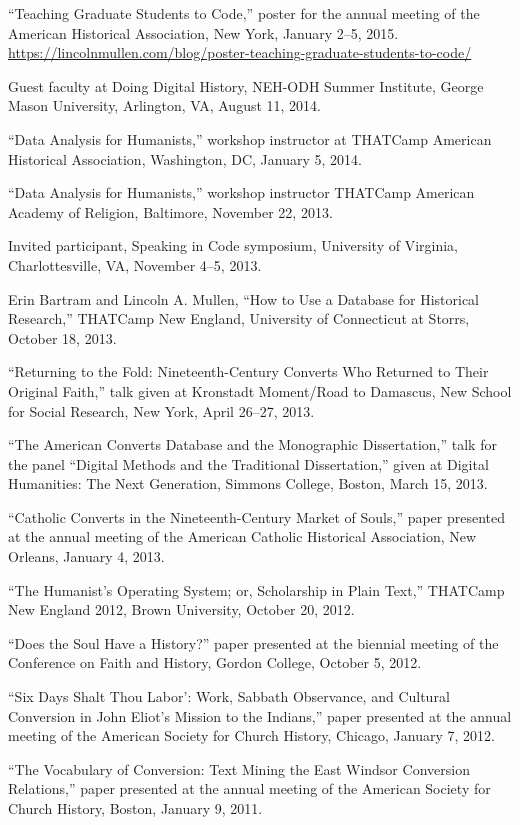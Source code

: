 \documentclass[11pt]{article}
\begin{document}
``Teaching Graduate Students to Code,'' poster for the annual meeting of the American Historical Association, New York, January 2--5, 2015.  \url{https://lincolnmullen.com/blog/poster-teaching-graduate-students-to-code/}

Guest faculty at Doing Digital History, NEH-ODH Summer Institute, George Mason University, Arlington, VA, August 11, 2014.

``Data Analysis for Humanists,'' workshop instructor at THATCamp American Historical Association, Washington, DC, January 5, 2014.

``Data Analysis for Humanists,'' workshop instructor THATCamp American Academy of Religion, Baltimore, November 22, 2013.

Invited participant, Speaking in Code symposium, University of Virginia, Charlottesville, VA, November 4--5, 2013.

Erin Bartram and Lincoln A. Mullen, ``How to Use a Database for Historical Research,'' THATCamp New England, University of Connecticut at Storrs, October 18, 2013.

``Returning to the Fold: Nineteenth-Century Converts Who Returned to Their Original Faith,'' talk given at Kronstadt Moment/Road to Damascus, New School for Social Research, New York, April 26--27, 2013.

``The American Converts Database and the Monographic Dissertation,'' talk for the panel ``Digital Methods and the Traditional Dissertation,'' given at Digital Humanities: The Next Generation, Simmons College, Boston, March 15, 2013.

``Catholic Converts in the Nineteenth-Century Market of Souls,'' paper presented at the annual meeting of the American Catholic Historical Association, New Orleans, January 4, 2013.

``The Humanist's Operating System; or, Scholarship in Plain Text,'' THATCamp New England 2012, Brown University, October 20, 2012.

``Does the Soul Have a History?'' paper presented at the biennial meeting of the Conference on Faith and History, Gordon College, October 5, 2012.

``Six Days Shalt Thou Labor': Work, Sabbath Observance, and Cultural Conversion in John Eliot's Mission to the Indians,'' paper presented at the annual meeting of the American Society for Church History, Chicago, January 7, 2012.

``The Vocabulary of Conversion: Text Mining the East Windsor Conversion Relations,'' paper presented at the annual meeting of the American Society for Church History, Boston, January 9, 2011.
\end{document}
